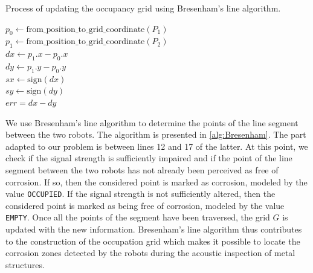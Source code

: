 \begin{algorithm}[h!]
	\caption{Process of updating the occupancy grid using Bresenham's line algorithm.}
	\label{alg:Bresenham}
	$p_0 \gets \text{from\_position\_to\_grid\_coordinate}(P_1)$ \\
	$p_1 \gets \text{from\_position\_to\_grid\_coordinate}(P_2)$ \\
	$dx \gets p_1.x - p_0.x$ \\
	$dy \gets p_1.y - p_0.y$ \\
	$sx \gets \text{sign}(dx)$ \\
	$sy \gets \text{sign}(dy)$ \\
	$err = dx - dy$ \\
\end{algorithm}

We use Bresenham's line algorithm to determine the points of the line segment between the two robots.
The algorithm is presented in \ref{alg:Bresenham}.
The part adapted to our problem is between lines 12 and 17 of the latter.
At this point, we check if the signal strength is sufficiently impaired and if the point of the line segment between the two robots has not already been perceived as free of corrosion.
If so, then the considered point is marked as corrosion, modeled by the value \texttt{OCCUPIED}.
If the signal strength is not sufficiently altered, then the considered point is marked as being free of corrosion, modeled by the value \texttt{EMPTY}.
Once all the points of the segment have been traversed, the grid $G$ is updated with the new information.
Bresenham's line algorithm thus contributes to the construction of the occupation grid which makes it possible to locate the corrosion zones detected by the robots during the acoustic inspection of metal structures.

